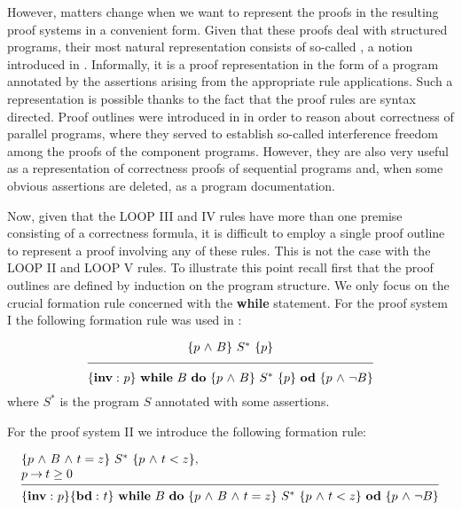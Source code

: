 \documentclass[runningheads]{llncs}       %
\begin{document}
However, matters change when we want to represent the proofs in the
resulting proof systems  in a convenient form. Given
that these proofs deal with structured programs, their most natural
representation consists of so-called , a notion
introduced in \cite{OG76a}.  Informally, it is a proof representation
in the form of a program annotated by the assertions arising from the
appropriate rule applications. Such a representation is possible
thanks to the fact that the proof rules are syntax directed. Proof
outlines were introduced in \cite{OG76a} in order to reason about
correctness of parallel programs, where they served to establish
so-called interference freedom among the proofs of the component
programs. However, they are also very useful as a representation of
correctness proofs of sequential programs and, when some obvious
assertions are deleted, as a program documentation.

Now, given that the LOOP III and IV rules have more than one premise
consisting of a correctness formula, it is difficult to employ
a single proof outline to represent a proof involving any of these rules.
This is not the case with the LOOP II and LOOP V rules. To illustrate this point
recall first that the proof outlines are defined by induction on the program structure.
We only focus on the crucial formation rule concerned with the \textbf{while} statement.
For the proof system I the following formation rule was used in \cite{ABO09}:

\[
\frac{\raisebox{2mm}{$ \HT{p \A B}{S^*}{p}$}}
            {\raisebox{-2mm}{$\HT{{\bf inv:}\ p}
                 {\WDD{B}{\HT{p \A B}{S^*}{p}}}
                 {p \A \neg B}$}}
\]
where $S^*$ is the program $S$ annotated with some assertions.
\III


\vspace{3mm}

For the proof system II we introduce the following formation rule:
\III

\NI
\[
\begin{array}{l}
\HT{p \A B \A t=z}{S^{*}}{p \A t<z},                    \\
p \ra t \geq 0                                          \\
[-\medskipamount]
\hrulefill                                              \\
\C{{\bf inv:}\ p}
\HT{{\bf bd:}\ t}
   {\WDD{B}{\HT{p \A B \A t = z}{S^*}{p \A t<z}}}
   {p \A \neg B}
\end{array}
\]
\end{document}
